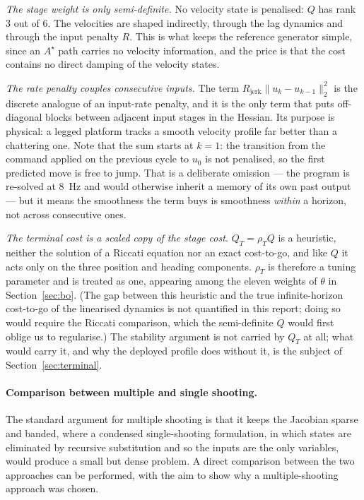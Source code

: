 \documentclass[11pt,a4paper]{article}
\newcommand{\astar}{$A^\star$}
\newcommand{\Rjerk}{R_{\mathrm{jerk}}}
\begin{document}
\smallskip\noindent \emph{The stage weight is only semi-definite.} No velocity state is penalised: $Q$ has rank $3$ out of $6$.
The velocities are shaped indirectly, through the lag dynamics and through the input penalty $R$. This is
what keeps the reference generator simple, since an \astar{} path carries no velocity information, and the
price is that the cost contains no direct damping of the velocity states.

\smallskip\noindent \emph{The rate penalty couples consecutive inputs.} The term $\Rjerk\|u_k-u_{k-1}\|_2^2$ is the discrete
analogue of an input-rate penalty, and it is the only term that puts off-diagonal blocks between adjacent
input stages in the Hessian. Its purpose is physical: a legged platform tracks a smooth velocity profile far
better than a chattering one. Note that the sum starts at $k=1$: the transition from the command applied on
the previous cycle to $u_0$ is not penalised, so the first predicted move is free to jump. That is a
deliberate omission --- the program is re-solved at $8$~Hz and would otherwise inherit a memory of its own
past output --- but it means the smoothness the term buys is smoothness \emph{within} a horizon, not across
consecutive ones.

\smallskip\noindent \emph{The terminal cost is a scaled copy of the stage cost.} $Q_T=\rho_T Q$ is a heuristic, neither the
solution of a Riccati equation nor an exact cost-to-go, and like $Q$ it acts only on the three position and
heading components. $\rho_T$ is therefore a tuning parameter and is treated as one, appearing among the
eleven weights of $\theta$ in Section~\ref{sec:bo}. (The gap between this heuristic and the true
infinite-horizon cost-to-go of the linearised dynamics is not quantified in this report; doing so would
require the Riccati comparison, which the semi-definite $Q$ would first oblige us to regularise.) The
stability argument is not carried by $Q_T$ at all; what would carry it, and why the deployed profile does
without it, is the subject of Section~\ref{sec:terminal}.

\paragraph{Comparison between multiple and single shooting.} The standard argument for multiple shooting is that
it keeps the Jacobian sparse and banded, where a condensed single-shooting formulation, in which states are eliminated
by recursive substitution and so the inputs are the only variables, would produce a small but dense problem. A direct comparison between the two approaches can be performed, with the aim to show why a multiple-shooting approach was chosen. 
\end{document}
